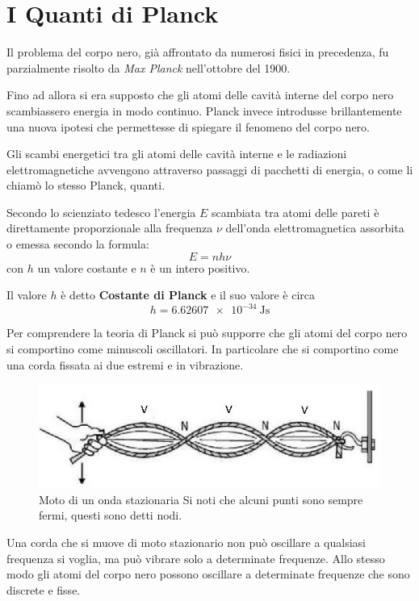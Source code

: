 \documentclass[12pt,twoside]{report}
\begin{document}


\section{I Quanti di Planck}
\par{Il problema del corpo nero, già affrontato da numerosi fisici in precedenza, fu parzialmente risolto da \textit{Max Planck} nell'ottobre del 1900.}
\par{Fino ad allora si era supposto che gli atomi delle cavità interne del corpo nero scambiassero energia in modo continuo. Planck invece introdusse brillantemente una nuova ipotesi che permettesse di spiegare il fenomeno del corpo nero.}
\par{Gli scambi energetici tra gli atomi delle cavità interne e le radiazioni elettromagnetiche avvengono attraverso passaggi di  pacchetti di energia, o come li chiamò lo stesso Planck, \textit{}{quanti}.}
\par{Secondo lo scienziato tedesco l'energia $E$ scambiata tra atomi delle pareti è direttamente proporzionale alla frequenza $\nu$ dell'onda elettromagnetica assorbita o emessa secondo la formula: $$E = nh\nu$$ con $h$ un valore costante e $n$ è un intero positivo.}
\par{Il valore $h$ è detto  \textbf{Costante di Planck} e il suo valore è circa}
$$ h = \SI{6.62607e-34}{\joule\second}$$
\par{Per comprendere la teoria di Planck si può supporre che gli atomi del corpo nero si comportino come minuscoli oscillatori. In particolare che si comportino come una corda fissata ai due estremi e in vibrazione.}
\begin{figure}[h]
\centering
\includegraphics[width = 0.7\hsize]{./figures/ondaStaz}
\caption{Moto di un onda stazionaria \newline Si noti che alcuni punti sono sempre fermi, questi sono detti nodi.}
\label{fig:logo}
\end{figure}
\par{Una corda che si muove di moto stazionario non può oscillare a qualsiasi frequenza si voglia, ma può vibrare solo a determinate frequenze. Allo stesso modo gli atomi del corpo nero possono oscillare a determinate frequenze che sono discrete e fisse.}
\end{document}

